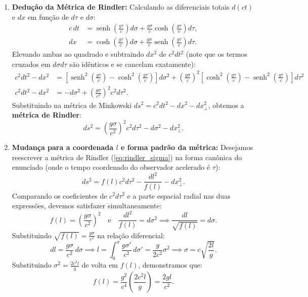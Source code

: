 \documentclass[11pt, a4paper]{article}
\begin{document}
\begin{enumerate}[label=\alph*)]
    \item \textbf{Dedução da Métrica de Rindler:} Calculando as diferenciais totais $d(ct)$ e $dx$ em função de $d\tau$ e $d\sigma$:
    \begin{align}
    c \, dt &= \operatorname{senh}\left(\frac{g \tau}{c}\right) d\sigma + \frac{g \sigma}{c} \cosh\left(\frac{g \tau}{c}\right) d\tau, \\
    dx &= \cosh\left(\frac{g \tau}{c}\right) d\sigma + \frac{g \sigma}{c} \operatorname{senh}\left(\frac{g \tau}{c}\right) d\tau.
    \end{align}
    Elevando ambas ao quadrado e subtraindo $dx^2$ de $c^2 dt^2$ (note que os termos cruzados em $d\sigma d\tau$ são idênticos e se cancelam exatamente):
    \begin{align}
    c^2 dt^2 - dx^2 &= \left[ \operatorname{senh}^2\left(\frac{g \tau}{c}\right) - \cosh^2\left(\frac{g \tau}{c}\right) \right] d\sigma^2 + \left(\frac{g \sigma}{c}\right)^2 \left[ \cosh^2\left(\frac{g \tau}{c}\right) - \operatorname{senh}^2\left(\frac{g \tau}{c}\right) \right] d\tau^2 \nonumber \\
    c^2 dt^2 - dx^2 &= -d\sigma^2 + \left(\frac{g \sigma}{c^2}\right)^2 c^2 d\tau^2.
    \end{align}
    Substituindo na métrica de Minkowski $ds^2 = c^2 dt^2 - dx^2 - dx_\perp^2$, obtemos a \textbf{métrica de Rindler}:
    \begin{equation}
    ds^2 = \left(\frac{g \sigma}{c^2}\right)^2 c^2 d\tau^2 - d\sigma^2 - dx_\perp^2. \label{eq:rindler_sigma}
    \end{equation}

    \item \textbf{Mudança para a coordenada $l$ e forma padrão da métrica:} Desejamos reescrever a métrica de Rindler (\ref{eq:rindler_sigma}) na forma canônica do enunciado (onde o tempo coordenado do observador acelerado é $\tau$):
    \begin{equation}
    ds^2 = f(l) c^2 d\tau^2 - \frac{dl^2}{f(l)} - dx_\perp^2.
    \end{equation}
    Comparando os coeficientes de $c^2 d\tau^2$ e a parte espacial radial nas duas expressões, devemos satisfazer simultaneamente:
    \begin{equation}
    f(l) = \left(\frac{g \sigma}{c^2}\right)^2 \quad \text{e} \quad \frac{dl^2}{f(l)} = d\sigma^2 \implies \frac{dl}{\sqrt{f(l)}} = d\sigma.
    \end{equation}
    Substituindo $\sqrt{f(l)} = \frac{g \sigma}{c^2}$ na relação diferencial:
    \begin{equation}
    dl = \frac{g \sigma}{c^2} \, d\sigma \implies l = \int_{0}^{\sigma} \frac{g \sigma'}{c^2} \, d\sigma' = \frac{g}{2 c^2} \sigma^2 \implies \sigma = c \sqrt{\frac{2 l}{g}}.
    \end{equation}
    Substituindo $\sigma^2 = \frac{2 c^2 l}{g}$ de volta em $f(l)$, demonstramos que:
    \begin{equation}
    f(l) = \frac{g^2}{c^4} \left( \frac{2 c^2 l}{g} \right) = \frac{2 g l}{c^2}.
    \end{equation}


\end{enumerate}
\end{document}
